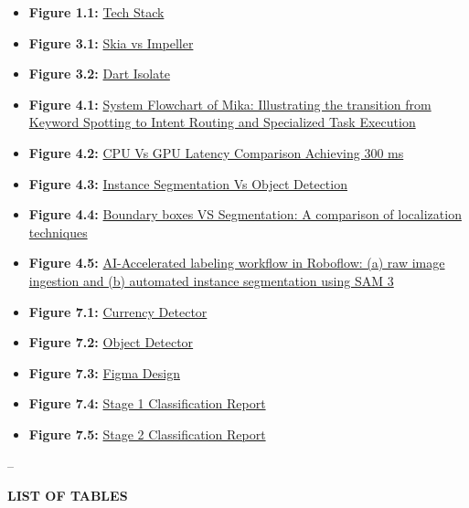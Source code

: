 \documentclass[12pt,a4paper]{report}
\begin{document}
\begin{itemize}
    \item[] \textbf{Figure 1.1:} \hyperlink{fig:1.1}{Tech Stack} 
    \item[] \textbf{Figure 3.1:} \hyperlink{fig:3.1}{Skia vs Impeller} 
    \item[] \textbf{Figure 3.2:} \hyperlink{fig:3.2}{Dart Isolate} 
    
    \item[] \textbf{Figure 4.1:} \hyperlink{fig:4.1}{System Flowchart of Mika: Illustrating the transition from Keyword Spotting to Intent Routing and Specialized Task Execution} 
    
    \item[] \textbf{Figure 4.2:} \hyperlink{fig:4.2}{CPU Vs GPU Latency Comparison Achieving 300 ms} 
    \item[] \textbf{Figure 4.3:} \hyperlink{fig:4.3}{Instance Segmentation Vs Object Detection} 
    \item[] \textbf{Figure 4.4:} \hyperlink{fig:4.4}{Boundary boxes VS Segmentation: A comparison of localization techniques} 
    
    \item[] \textbf{Figure 4.5:} \hyperlink{fig:4.5}{AI-Accelerated labeling workflow in Roboflow: (a) raw image ingestion and (b) automated instance segmentation using SAM 3} 
    
    \item[] \textbf{Figure 7.1:} \hyperlink{fig:7.1}{Currency Detector} 
    \item[] \textbf{Figure 7.2:} \hyperlink{fig:7.2}{Object Detector} 
    \item[] \textbf{Figure 7.3:} \hyperlink{fig:7.3}{Figma Design} 
    \item[] \textbf{Figure 7.4:} \hyperlink{fig:7.4}{Stage 1 Classification Report} 
    \item[] \textbf{Figure 7.5:} \hyperlink{fig:7.5}{Stage 2 Classification Report} 
\end{itemize}
--
\pagestyle{logoheader}
\clearpage
\thispagestyle{logoheader}

\begin{center}
    \vspace{1cm}
    {\large \textbf{LIST OF TABLES}}
\end{center}
\end{document}
